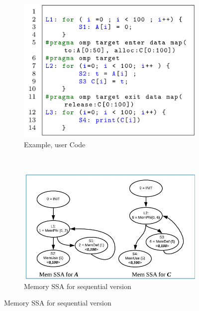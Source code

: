\begin{figure}[h!]
    \centering
    \begin{subfigure}[b]{0.45\textwidth}
        \includegraphics[width=\textwidth]{images/memorySSA-example1.png}
        \caption{Example, user Code}
        \label{fig:memorySSA-example1-s4}
    \end{subfigure}
    ~ %
    \begin{subfigure}[b]{0.5\textwidth}
        \includegraphics[width=\textwidth]{images/memorySSA-example1-s1.jpg}
        \caption{Memory SSA for sequential version}
        \label{fig:memorySSA-example1-s1}
    \end{subfigure}
    

\end{figure}
